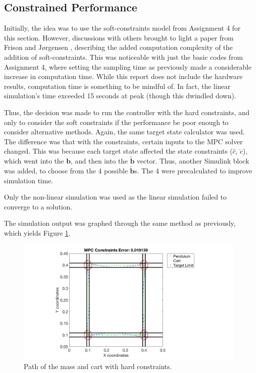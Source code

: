 \documentclass[letterpaper, 10 pt, conference]{ieeeconf} %
\begin{document}
\subsection{Constrained Performance}
Initially, the idea was to use the soft-constraints model from Assignment 4 for this section. However, discussions with others brought to light a paper from Frison and Jørgensen \cite{softconstraints}, describing the added computation complexity of the addition of soft-constraints. This was noticeable with just the basic codes from Assignment 4, where setting the sampling time as previously made a considerable increase in computation time. While this report does not include the hardware results, computation time is something to be mindful of. In fact, the linear simulation's time exceeded 15 seconds at peak (though this dwindled down).

Thus, the decision was made to run the controller with the hard constraints, and only to consider the soft constraints if the performance be poor enough to consider alternative methods. Again, the same target state calculator was used. The difference was that with the constraints, certain inputs to the MPC solver changed. This was because each target state affected the state constraints ($\hat{c}$, $\check{c}$), which went into the $\mathbf{b}$, and then into the $\mathbf{\tilde{b}}$ vector. Thus, another Simulink block was added, to choose from the 4 possible $\mathbf{\tilde{b}}$s. The 4 were precalculated to improve simulation time.

Only the non-linear simulation was used as the linear simulation failed to converge to a solution. 

The simulation output was graphed through the same method as previously, which yields Figure \ref{fig:mpc}.
\begin{figure}[!ht]
    \raggedleft
    \includegraphics[width = 1.25\linewidth]{mpc}
    \caption{Path of the mass and cart with hard constraints.}
    \label{fig:mpc}
\end{figure}
\end{document}
